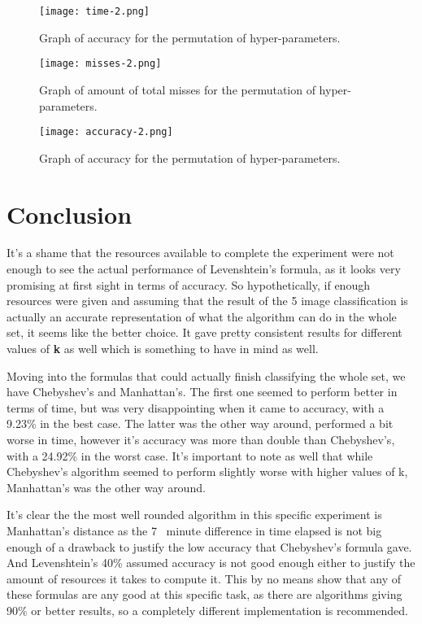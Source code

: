 \documentclass[conference,compsoc]{IEEEtran}
\begin{document}
\begin{figure}[H]
\texttt{[image: time-2.png]}
\caption{Graph of accuracy for the permutation of hyper-parameters.}
\label{fig:accuracy-all}
\centering
\end{figure}

\begin{figure}[H]
\texttt{[image: misses-2.png]}
\caption{Graph of amount of total misses for the permutation of hyper-parameters.}
\label{fig:misses-all}
\centering
\end{figure}

\begin{figure}[H]
\texttt{[image: accuracy-2.png]}
\caption{Graph of accuracy for the permutation of hyper-parameters.}
\label{fig:accuracy-all}
\centering
\end{figure}


\section{Conclusion}
It's a shame that the resources available to complete the experiment were not enough to see the actual performance of Levenshtein's formula, as it looks very promising at first sight in terms of accuracy. So hypothetically, if enough resources were given and assuming that the result of the 5 image classification is actually an accurate representation of what the algorithm can do in the whole set, it seems like the better choice. It gave pretty consistent results for different values of \textbf{k} as well which is something to have in mind as well. 

Moving into the formulas that could actually finish classifying the whole set, we have Chebyshev's and Manhattan's. The first one seemed to perform better in terms of time, but was very disappointing when it came to accuracy, with a 9.23\% in the best case. The latter was the other way around, performed a bit worse in time, however it's accuracy was more than double than Chebyshev's, with a 24.92\% in the worst case. It's important to note as well that while Chebyshev's algorithm seemed to perform slightly worse with higher values of k, Manhattan's was the other way around.

It's clear the the most well rounded algorithm in this specific experiment is Manhattan's distance as the 7~ minute difference in time elapsed is not big enough of a drawback to justify the low accuracy that Chebyshev's formula gave. And Levenshtein's 40\% assumed accuracy is not good enough either to justify the amount of resources it takes to compute it. This by no means show that any of these formulas are any good at this specific task, as there are algorithms giving 90\% or better results, so a completely different implementation is recommended.
\end{document}
